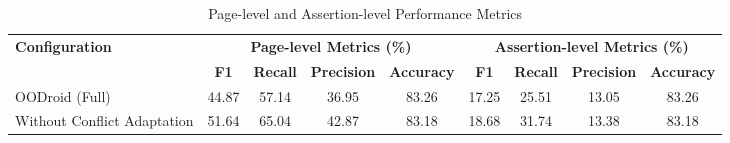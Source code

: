\begin{table}[t]
\centering
\caption{Page-level and Assertion-level Performance Metrics}
\label{tab:performance_metrics}
\begin{tabular}{lcccccccc}
\toprule
\textbf{Configuration} & \multicolumn{4}{c}{\textbf{Page-level Metrics (\%)}} & \multicolumn{4}{c}{\textbf{Assertion-level Metrics (\%)}} \\
\cmidrule(lr){2-5} \cmidrule(lr){6-9}
 & \textbf{F1} & \textbf{Recall} & \textbf{Precision} & \textbf{Accuracy} & \textbf{F1} & \textbf{Recall} & \textbf{Precision} & \textbf{Accuracy} \\
\midrule
OODroid (Full) & 44.87 & 57.14 & 36.95 & 83.26 & 17.25 & 25.51 & 13.05 & 83.26 \\
Without Conflict Adaptation & 51.64 & 65.04 & 42.87 & 83.18 & 18.68 & 31.74 & 13.38 & 83.18 \\
\bottomrule
\end{tabular}
\end{table}

